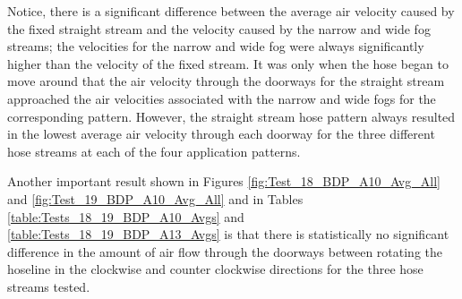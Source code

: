 \documentclass[12pt,oneside]{book}
\begin{document}
Notice, there is a significant difference between the average air velocity caused by the fixed straight stream and the velocity caused by the narrow and wide fog streams; the velocities for the narrow and wide fog were always significantly higher than the velocity of the fixed stream. It was only when the hose began to move around that the air velocity through the doorways for the straight stream approached the air velocities associated with the narrow and wide fogs for the corresponding pattern. However, the straight stream hose pattern always resulted in the lowest average air velocity through each doorway for the three different hose streams at each of the four application patterns. 

Another important result shown in Figures \ref{fig:Test_18_BDP_A10_Avg_All} and \ref{fig:Test_19_BDP_A10_Avg_All} and in Tables \ref{table:Tests_18_19_BDP_A10_Avgs} and \ref{table:Tests_18_19_BDP_A13_Avgs} is that there is statistically no significant difference in the amount of air flow through the doorways between rotating the hoseline in the clockwise and counter clockwise directions for the three hose streams tested. 

%
%
%
%
%
%
\end{document}
